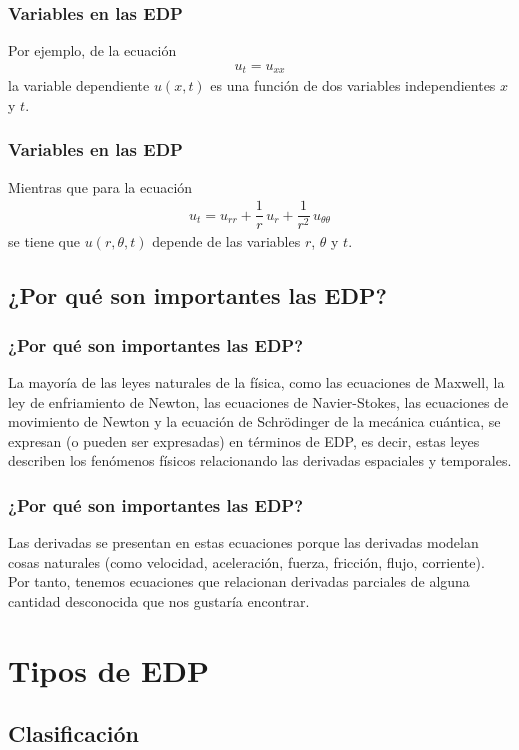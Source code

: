 \documentclass[12pt]{beamer}
\begin{document}
\begin{frame}
\frametitle{Variables en las EDP}
Por ejemplo, de la ecuación
\begin{align*}
u_{t} = u_{xx}
\end{align*}
la variable dependiente $u(x, t)$ es una función de dos variables independientes $x$ y $t$.
\end{frame}
\begin{frame}
\frametitle{Variables en las EDP}
Mientras que para la ecuación
\begin{align*}
u_{t} = u_{rr} + \dfrac{1}{r} \, u_{r} + \dfrac{1}{r^{2}} \, u_{\theta \theta}
\end{align*}
se tiene que $u(r, \theta, t)$ depende de las variables $r$, $\theta$ y $t$.
\end{frame}

\subsection{¿Por qué son importantes las EDP?}

\begin{frame}
\frametitle{¿Por qué son importantes las EDP?}
La mayoría de las leyes naturales de la física, como las ecuaciones de Maxwell, la ley de enfriamiento de Newton, las ecuaciones de Navier-Stokes, las ecuaciones de movimiento de Newton y la ecuación de Schrödinger de la mecánica cuántica, se expresan (o pueden ser expresadas) en términos de EDP, es decir, estas leyes describen los fenómenos físicos relacionando las derivadas espaciales y temporales.
\end{frame}
\begin{frame}
\frametitle{¿Por qué son importantes las EDP?}
Las derivadas se presentan en estas ecuaciones porque las derivadas modelan cosas naturales (como velocidad, aceleración, fuerza, fricción, flujo, corriente). 
\\
\bigskip
Por tanto, tenemos ecuaciones que relacionan derivadas parciales de alguna cantidad desconocida que nos gustaría encontrar.
\end{frame}

\section{Tipos de EDP}
\subsection{Clasificación}
\end{document}
